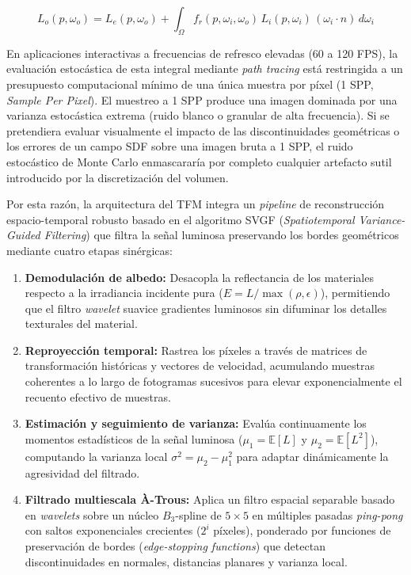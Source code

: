 \begin{equation}
  L_o(p, \omega_o) = L_e(p, \omega_o) + \int_{\Omega} f_r(p, \omega_i, \omega_o) \, L_i(p, \omega_i) \, (\omega_i \cdot n) \, d\omega_i
\end{equation}

En aplicaciones interactivas a frecuencias de refresco elevadas (60 a 120 FPS), la evaluación estocástica de esta integral mediante \textit{path tracing} está restringida a un presupuesto computacional mínimo de una única muestra por píxel (1 SPP, \textit{Sample Per Pixel}). El muestreo a 1 SPP produce una imagen dominada por una varianza estocástica extrema (ruido blanco o granular de alta frecuencia). Si se pretendiera evaluar visualmente el impacto de las discontinuidades geométricas o los errores de un campo SDF sobre una imagen bruta a 1 SPP, el ruido estocástico de Monte Carlo enmascararía por completo cualquier artefacto sutil introducido por la discretización del volumen.

Por esta razón, la arquitectura del TFM integra un \textit{pipeline} de reconstrucción espacio-temporal robusto basado en el algoritmo SVGF (\textit{Spatiotemporal Variance-Guided Filtering}) \cite{schied2017} que filtra la señal luminosa preservando los bordes geométricos mediante cuatro etapas sinérgicas:

\begin{enumerate}
  \item \textbf{Demodulación de albedo:} Desacopla la reflectancia de los materiales respecto a la irradiancia incidente pura ($E = L / \max(\rho, \epsilon)$), permitiendo que el filtro \textit{wavelet} suavice gradientes luminosos sin difuminar los detalles texturales del material.
  \item \textbf{Reproyección temporal:} Rastrea los píxeles a través de matrices de transformación históricas y vectores de velocidad, acumulando muestras coherentes a lo largo de fotogramas sucesivos para elevar exponencialmente el recuento efectivo de muestras.
  \item \textbf{Estimación y seguimiento de varianza:} Evalúa continuamente los momentos estadísticos de la señal luminosa ($\mu_1 = \mathbb{E}[L]$ y $\mu_2 = \mathbb{E}[L^2]$), computando la varianza local $\sigma^2 = \mu_2 - \mu_1^2$ para adaptar dinámicamente la agresividad del filtrado.
  \item \textbf{Filtrado multiescala À-Trous:} Aplica un filtro espacial separable basado en \textit{wavelets} \cite{dammertz2010} sobre un núcleo $B_3$-spline de $5 \times 5$ en múltiples pasadas \textit{ping-pong} con saltos exponenciales crecientes ($2^i$ píxeles), ponderado por funciones de preservación de bordes (\textit{edge-stopping functions}) que detectan discontinuidades en normales, distancias planares y varianza local.
\end{enumerate}

